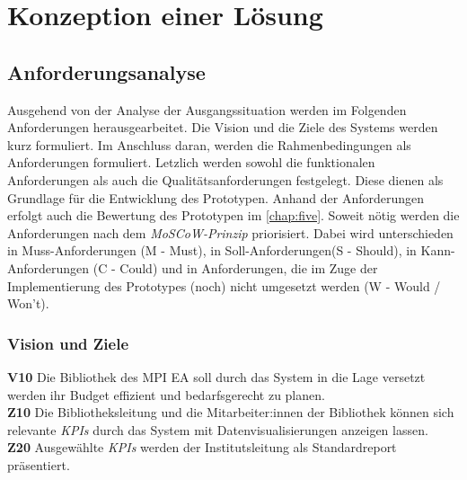 \chapter{Konzeption einer Lösung}
\label{chap:four}

\section{Anforderungsanalyse}
Ausgehend von der Analyse der Ausgangssituation werden im Folgenden 
Anforderungen herausgearbeitet. Die Vision und die Ziele des Systems werden kurz formuliert. Im Anschluss daran,
werden die Rahmenbedingungen als Anforderungen formuliert. Letzlich werden sowohl die funktionalen Anforderungen als
auch die Qualitätsanforderungen festgelegt. Diese dienen als Grundlage für die Entwicklung des Prototypen. 
Anhand der Anforderungen erfolgt auch die Bewertung des Prototypen im \autoref{chap:five}. 
Soweit nötig werden die Anforderungen nach dem \textit{MoSCoW-Prinzip} priorisiert. 
Dabei wird unterschieden in Muss-Anforderungen (M - Must), in Soll-Anforderungen(S - Should), in Kann-Anforderungen (C - Could) und in Anforderungen,
die im Zuge der Implementierung des Prototypes (noch) nicht umgesetzt werden (W - Would / Won't).

\subsection{Vision und Ziele}
\textbf{V10} Die Bibliothek des \acrshort{MPI EA} soll durch das System in die Lage versetzt werden ihr Budget effizient und bedarfsgerecht zu planen.\\
\textbf{Z10} Die Bibliotheksleitung und die Mitarbeiter:innen der Bibliothek können sich relevante \textit{\acrshort{KPI}s} durch das System mit
Datenvisualisierungen anzeigen lassen. \\
\textbf{Z20} Ausgewählte \textit{\acrshort{KPI}s} werden der Institutsleitung als Standardreport präsentiert.

